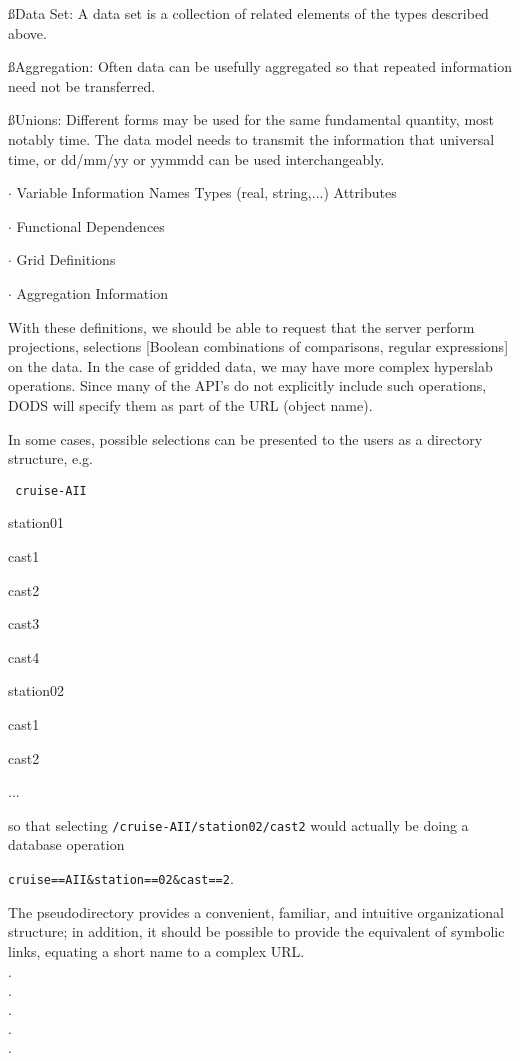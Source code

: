 \ss{Data Set:} A data set is a collection of related elements of the
types described above.

\ss{Aggregation:} Often data can be usefully aggregated so that
repeated information need not be transferred.

\ss{Unions:} Different forms may be used for the same
fundamental quantity, most notably time. The data model needs to
transmit the information that universal time, or dd/mm/yy or yymmdd
can be used interchangeably.

\vfill\eject
{}

\item{$\cdot$} Variable Information
\itemitem{$\cdot$} Names
\itemitem{$\cdot$} Types (real, string,...)
\itemitem{$\cdot$} Attributes
\item{$\cdot$} Functional Dependences
\item{$\cdot$} Grid Definitions
\item{$\cdot$} Aggregation Information


With these definitions, we should be able to request that the server
perform projections, selections [Boolean combinations of comparisons,
regular expressions] on the data. In the case of gridded data, we may
have more complex hyperslab operations. Since many of the API's do not
explicitly include such operations, DODS will specify them as part of
the URL (object name). 

\vfill\eject
{}

In some cases, possible selections can be presented to the users as a
directory structure, e.g.

{\tt
\ni\quad cruise-AII

\ni\quad\quad station01

\ni\quad\quad\quad cast1

\ni\quad\quad\quad cast2

\ni\quad\quad\quad cast3

\ni\quad\quad\quad cast4

\ni\quad\quad station02

\ni\quad\quad\quad cast1

\ni\quad\quad\quad cast2

\ni\quad...
}

\ni so that selecting {\tt /cruise-AII/station02/cast2} would actually
be doing a database operation 

{\tt cruise==AII\&station==02\&cast==2}.

\ni The pseudodirectory provides a convenient, familiar, and intuitive
organizational structure; in addition, it should be possible to
provide the equivalent of symbolic links, equating a short name to a
complex URL.


\bye
\item{$\cdot$} 
\item{$\cdot$} 
\item{$\cdot$} 
\item{$\cdot$} 
\item{$\cdot$} 
